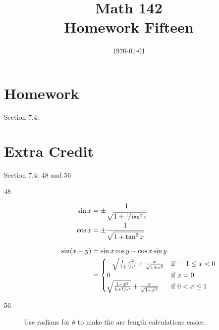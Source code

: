 \documentclass{exam}
\author{}
\date{\today}
\title{Math 142 \\ Homework Fifteen}
\begin{document}
  \maketitle

  \section{Homework}
  Section 7.4:

  \section{Extra Credit}
  Section 7.4: 48 and 56

  \ifprintanswers
    \begin{description}
      \item[48]
        \begin{align*}
          \sin x &= \pm \frac{1}{\sqrt{1 + \sfrac{1}{\tan^2 x}}} \\
          \cos x &= \pm \frac{1}{\sqrt{1 + \tan^2 x}} \\
          \\
          \sin(x - y) &= \sin x \cos y - \cos x \sin y \\
                      &= \begin{cases}
                            - \sqrt{ \frac{1 - x^2}{1 + \sfrac{1}{x^2}}} + \frac{x}{\sqrt{1 + x^2}} & \mbox{if } -1 \leq x < 0 \\
                            0                                                                       & \mbox{if } x = 0 \\
                            \sqrt{ \frac{1 - x^2}{1 + \sfrac{1}{x^2}}} + \frac{x}{\sqrt{1 + x^2}}   & \mbox{if } 0 < x \leq 1 \\
                          \end{cases}
        \end{align*}

      \item[56]
        Use radians for $\theta$ to make the arc length calculations easier.

\end{description}
\end{document}
